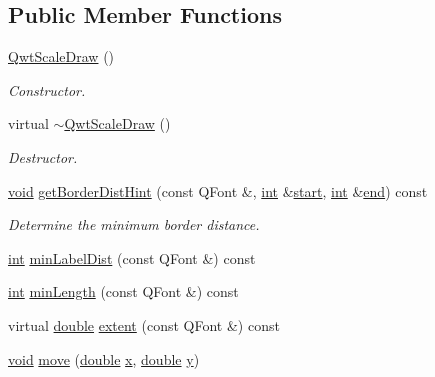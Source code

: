 \subsection*{Public Member Functions}
\begin{DoxyCompactItemize}
\item 
\hyperlink{class_qwt_scale_draw_adbd01ba8d7f19fb3122f917b1c74145b}{Qwt\-Scale\-Draw} ()
\begin{DoxyCompactList}\small\item\em Constructor. \end{DoxyCompactList}\item 
virtual \hyperlink{class_qwt_scale_draw_a9c907c8fa27ec7312e78145e3050c599}{$\sim$\-Qwt\-Scale\-Draw} ()
\begin{DoxyCompactList}\small\item\em Destructor. \end{DoxyCompactList}\item 
\hyperlink{group___u_a_v_objects_plugin_ga444cf2ff3f0ecbe028adce838d373f5c}{void} \hyperlink{class_qwt_scale_draw_ab6c5d65a109b63b2dd62984d38a4df0e}{get\-Border\-Dist\-Hint} (const Q\-Font \&, \hyperlink{ioapi_8h_a787fa3cf048117ba7123753c1e74fcd6}{int} \&\hyperlink{glext_8h_a13be19455586e95d5a42ed8f054afad2}{start}, \hyperlink{ioapi_8h_a787fa3cf048117ba7123753c1e74fcd6}{int} \&\hyperlink{glext_8h_a432111147038972f06e049e18a837002}{end}) const 
\begin{DoxyCompactList}\small\item\em Determine the minimum border distance. \end{DoxyCompactList}\item 
\hyperlink{ioapi_8h_a787fa3cf048117ba7123753c1e74fcd6}{int} \hyperlink{class_qwt_scale_draw_a1e60d584f563933afba119d443ba5b32}{min\-Label\-Dist} (const Q\-Font \&) const 
\item 
\hyperlink{ioapi_8h_a787fa3cf048117ba7123753c1e74fcd6}{int} \hyperlink{class_qwt_scale_draw_a2fbdde2e1263664069e2e5f9a1fc9266}{min\-Length} (const Q\-Font \&) const 
\item 
virtual \hyperlink{_super_l_u_support_8h_a8956b2b9f49bf918deed98379d159ca7}{double} \hyperlink{class_qwt_scale_draw_a1fa0cebc2b8f69dce72b0514ad7653f0}{extent} (const Q\-Font \&) const 
\item 
\hyperlink{group___u_a_v_objects_plugin_ga444cf2ff3f0ecbe028adce838d373f5c}{void} \hyperlink{class_qwt_scale_draw_a15f91bdd71ec87abe618e00cf18aa3f1}{move} (\hyperlink{_super_l_u_support_8h_a8956b2b9f49bf918deed98379d159ca7}{double} \hyperlink{glext_8h_a1db9d104e3c2128177f26aff7b46982f}{x}, \hyperlink{_super_l_u_support_8h_a8956b2b9f49bf918deed98379d159ca7}{double} \hyperlink{glext_8h_a42315f3ed8fff752bb47fd782309fcfc}{y})

\end{DoxyCompactItemize}
